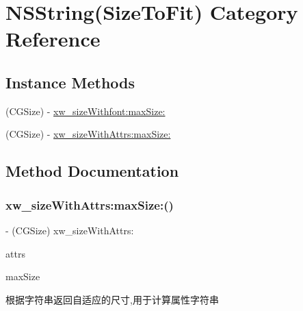 \hypertarget{category_n_s_string_07_size_to_fit_08}{}\section{N\+S\+String(Size\+To\+Fit) Category Reference}
\label{category_n_s_string_07_size_to_fit_08}
\subsection*{Instance Methods}
\begin{DoxyCompactItemize}
\item 
(C\+G\+Size) -\/ \mbox{\hyperlink{category_n_s_string_07_size_to_fit_08_a5d0f332e39de72b491d7899d32eafcb8}{xw\+\_\+size\+Withfont\+:max\+Size\+:}}
\item 
(C\+G\+Size) -\/ \mbox{\hyperlink{category_n_s_string_07_size_to_fit_08_a982d2ac0ec84603f1a3d84943990382c}{xw\+\_\+size\+With\+Attrs\+:max\+Size\+:}}
\end{DoxyCompactItemize}


\subsection{Method Documentation}
\mbox{\label{category_n_s_string_07_size_to_fit_08_a982d2ac0ec84603f1a3d84943990382c}} 
\subsubsection{\texorpdfstring{xw\+\_\+size\+With\+Attrs\+:max\+Size\+:()}{xw\_sizeWithAttrs:maxSize:()}}
{\footnotesize\ttfamily -\/ (C\+G\+Size) xw\+\_\+size\+With\+Attrs\+: \begin{DoxyParamCaption}\item[{(N\+S\+Dictionary $\ast$)}]{attrs }\item[{maxSize:(C\+G\+Size)}]{max\+Size }\end{DoxyParamCaption}}

根据字符串返回自适应的尺寸,用于计算属性字符串



